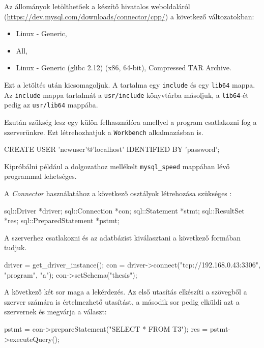 
Az állományok letölthetőek a készítő hivatalos weboldaláról (\url{https://dev.mysql.com/downloads/connector/cpp/}) a következő változatokban:
\begin{itemize}
	\item Linux - Generic,
	\item All,
	\item Linux - Generic (glibc 2.12) (x86, 64-bit), Compressed TAR Archive.
\end{itemize}
Ezt a letöltés után kicsomagoljuk. A tartalma egy \texttt{include} és egy \texttt{lib64} mappa. Az \texttt{include} mappa tartalmát a \texttt{usr/include} könyvtárba másoljuk, a \texttt{lib64}-ét pedig az \texttt{usr/lib64} mappába.

Ezután szükség lesz egy külön felhasználóra amellyel a program csatlakozni fog a szerverünkre. Ezt létrehozhatjuk a \texttt{Workbench} alkalmazásban is.
\begin{python}
CREATE USER 'newuser'@'localhost' IDENTIFIED BY 'password';
\end{python}


Kipróbálni például a dolgozathoz mellékelt \texttt{mysql\_speed} mappában lévő programmal lehetséges.

A \textit{Connector} használatához a következő osztályok létrehozása szükséges \cite{connector_program}:
\begin{cpp}
sql::Driver *driver;
sql::Connection *con;
sql::Statement *stmt;
sql::ResultSet *res;
sql::PreparedStatement *pstmt;
\end{cpp}
A szerverhez csatlakozni és az adatbázist kiválasztani a következő formában tudjuk.
\begin{cpp}
driver = get_driver_instance();
con = driver->connect("tcp://192.168.0.43:3306", "program", "a");
con->setSchema("thesis");
\end{cpp}
A következő két sor maga a lekérdezés. Az első utasítás elkészíti a szövegből a szerver számára is értelmezhető utasítást, a második sor pedig elküldi azt a szervernek és megvárja a választ:
\begin{cpp}
pstmt = con->prepareStatement("SELECT * FROM T3");
res = pstmt->executeQuery();
\end{cpp}

